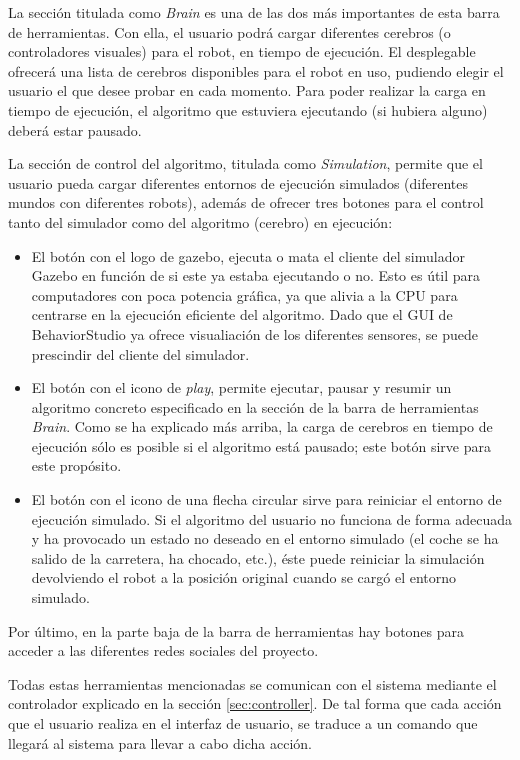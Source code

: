 La sección titulada como \textit{Brain} es una de las dos más importantes de esta barra de herramientas. Con ella, el usuario podrá cargar diferentes cerebros (o controladores visuales) para el robot, en tiempo de ejecución. El desplegable ofrecerá una lista de cerebros disponibles para el robot en uso, pudiendo elegir el usuario el que desee probar en cada momento. Para poder realizar la carga en tiempo de ejecución, el algoritmo que estuviera ejecutando (si hubiera alguno) deberá estar pausado.

La sección de control del algoritmo, titulada como \textit{Simulation}, permite que el usuario pueda cargar diferentes entornos de ejecución simulados (diferentes mundos con diferentes robots), además de ofrecer tres botones para el control tanto del simulador como del algoritmo (cerebro) en ejecución:

\begin{itemize}
    \item El botón con el logo de gazebo, ejecuta o mata el cliente del simulador Gazebo en función de si este ya estaba ejecutando o no. Esto es útil para computadores con poca potencia gráfica, ya que alivia a la CPU para centrarse en la ejecución eficiente del algoritmo. Dado que el GUI de BehaviorStudio ya ofrece visualiación de los diferentes sensores, se puede prescindir del cliente del simulador.
    \item El botón con el icono de \textit{play}, permite ejecutar, pausar y resumir un algoritmo concreto especificado en la sección de la barra de herramientas \textit{Brain}. Como se ha explicado más arriba, la carga de cerebros en tiempo de ejecución sólo es posible si el algoritmo está pausado; este botón sirve para este propósito.
    \item El botón con el icono de una flecha circular sirve para reiniciar el entorno de ejecución simulado. Si el algoritmo del usuario no funciona de forma adecuada y ha provocado un estado no deseado en el entorno simulado (el coche se ha salido de la carretera, ha chocado, etc.), éste puede reiniciar la simulación devolviendo el robot a la posición original cuando se cargó el entorno simulado.
\end{itemize}

Por último, en la parte baja de la barra de herramientas hay botones para acceder a las diferentes redes sociales del proyecto.

Todas estas herramientas mencionadas se comunican con el sistema mediante el controlador explicado en la sección \ref{sec:controller}. De tal forma que cada acción que el usuario realiza en el interfaz de usuario, se traduce a un comando que llegará al sistema para llevar a cabo dicha acción.

